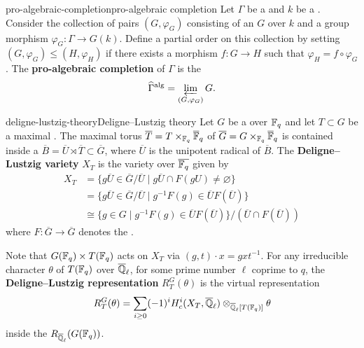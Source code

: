 \begin{topic}{pro-algebraic-completion}{pro-algebraic completion}
    Let $\Gamma$ be a  and $k$ be a . Consider the collection of pairs $(G, \varphi_G)$ consisting of an   $G$ over $k$ and a group morphism $\varphi_G : \Gamma \to G(k)$. Define a partial order on this collection by setting $(G, \varphi_G) \le (H, \varphi_H)$ if there exists a morphism $f : G \to H$ such that $\varphi_H = f \circ \varphi_G$. The \textbf{pro-algebraic completion} of $\Gamma$ is the 
    \[ \widehat{\Gamma}^\textup{alg} = \varprojlim_{(G, \varphi_G)} G . \]
\end{topic}

\begin{topic}{deligne-lustzig-theory}{Deligne--Lustzig theory}
    Let $G$ be a    over $\mathbb{F}_q$ and let $T \subset G$ be a maximal . The maximal torus $\overline{T} = T \times_{\mathbb{F}_q} \overline{\mathbb{F}}_q$ of $\overline{G} = G \times_{\mathbb{F}_q} \overline{\mathbb{F}}_q$ is contained inside a  $\overline{B} = \overline{U} \rtimes \overline{T} \subset \overline{G}$, where $\overline{U}$ is the unipotent radical of $\overline{B}$.
    The \textbf{Deligne--Lustzig variety} $X_T$ is the variety over $\overline{\mathbb{F}_q}$ given by
    \[ \begin{aligned}
        X_T &= \{ g \overline{U} \in \overline{G} / \overline{U} \mid g \overline{U} \cap F(g U) \ne \varnothing \} \\
            &= \{ g \overline{U} \in \overline{G} / \overline{U} \mid g^{-1} F(g) \in \overline{U} F(\overline{U}) \} \\
            &\cong \{ g \in G \mid g^{-1} F(g) \in \overline{U} F(\overline{U}) \} / (\overline{U} \cap F(\overline{U}))
    \end{aligned} \]
    where $F : \overline{G} \to \overline{G}$ denotes the .
    
    Note that $G(\mathbb{F}_q) \times T(\mathbb{F}_q)$ acts on $X_T$ via $(g, t) \cdot x = g x t^{-1}$. For any irreducible character $\theta$ of $T(\mathbb{F}_q)$ over $\overline{\mathbb{Q}}_\ell$, for some prime number $\ell$ coprime to $q$, the \textbf{Deligne--Lustzig representation} $R^G_T(\theta)$ is the virtual representation
    \[ R^G_T(\theta) = \sum_{i \ge 0} (-1)^i H_c^i(X_T, \overline{\mathbb{Q}}_\ell) \otimes_{\overline{\mathbb{Q}}_\ell[T(\mathbb{F}_q)]} \theta \]
    inside the  $R_{\overline{\mathbb{Q}}_\ell}(G(\mathbb{F}_q))$.
\end{topic}

